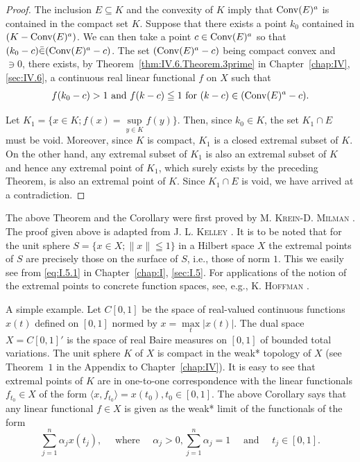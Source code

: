 \begin{proof}
 The inclusion $E \subseteq K$ and the convexity of $K$ imply that $\operatorname{Conv}(E)^a$ is contained in the compact set $K$. Suppose that there exists a point $k_0$ contained in $(K - \operatorname{Conv}(E)^a)$. We can then take a point $c \in \operatorname{Conv}(E)^a$ so that $(k_0 - c) \bar{\in} (\operatorname{Conv}(E)^a - c)$. The set $(\operatorname{Conv}(E)^a - c)$ being compact convex and $\ni 0$, there exists, by Theorem~\ref{thm:IV.6.Theorem.3prime} in Chapter~\ref{chap:IV}, \ref{sec:IV.6}, a continuous real linear functional $f$ on $X$ such that 
\[
f (k _{0} - c) > 1 \text{ and } f (k - c) \leqq 1 \text{ for } (k - c) \in (\operatorname{Conv} (E) ^{a} - c). \]

Let $K_{1} = \{x \in K; f(x) = \sup\limits_{y \in K} f(y)\}$. Then, since $k_{0} \in K$, the set $K_{1} \cap E$ must be void. Moreover, since $K$ is compact, $K_{1}$ is a closed extremal subset of $K$. On the other hand, any extremal subset of $K_{1}$ is also an extremal subset of $K$ and hence any extremal point of $K_{1}$, which surely exists by the preceding Theorem, is also an extremal point of $K$. Since $K_{1} \cap E$ is void, we have arrived at a contradiction. 
\end{proof}
\begin{remarku} The above Theorem and the Corollary were first proved by M. \textsc{Krein}-D. \textsc{Milman} \cite{krein165}. The proof given above is adapted from J. L. \textsc{Kelley} \cite{kelley147}. It is to be noted that for the unit sphere $S = \{x \in X; \| x \| \leqq 1\}$ in a Hilbert space $X$ the extremal points of $S$ are precisely those on the surface of $S$, i.e., those of norm $1$. This we easily see from \eqref{eq:I.5.1} in Chapter~\ref{chap:I}, \ref{sec:I.5}. For applications of the notion of the extremal points to concrete function spaces, see, e.g., K. \textsc{Hoffman} \cite{hirsch108}. 
\end{remarku}

A simple example. Let $C[0,1]$ be the space of real-valued continuous functions $x(t)$ defined on $[0,1]$ normed by $x = \max\limits_t |x(t)|$. The dual space $X = C[0,1]'$ is the space of real Baire measures on $[0,1]$ of bounded total variations. The unit sphere $K$ of $X$ is compact in the weak* topology of $X$ (see Theorem~\hyperref[thm:AV.1.Theorem.1]{$1$} in the Appendix to Chapter~\ref{chap:IV}). It is easy to see that extremal points of $K$ are in one-to-one correspondence with the linear functionals $f_{t_0} \in X$ of the form $\langle x, f_{t_0} \rangle = x(t_0), t_0 \in [0,1]$. The above Corollary says that any linear functional $f \in X$ is given as the weak* limit of the functionals of the form 
\[
\sum\limits_{j=1} ^{n} \alpha_{j} x (t _{j}), \quad \text{ where } \quad \alpha_{j} > 0, \sum\limits_{j=1} ^{n} \alpha_{j} = 1 \quad \text{ and } \quad t _{j} \in [ 0, 1 ].
\]

